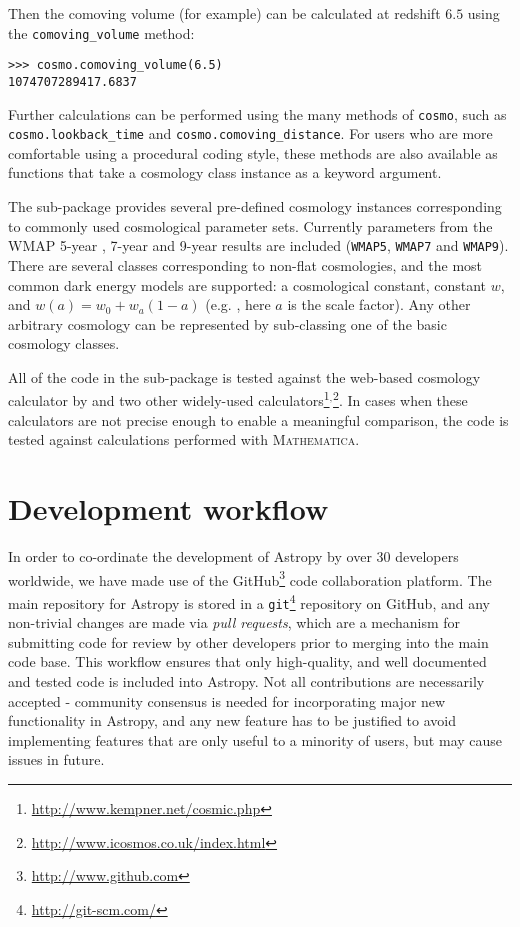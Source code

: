 \documentclass[traditabstract]{aa}
\begin{document}
\noindent Then the comoving volume (for example) can be calculated at
redshift $6.5$ using the \texttt{comoving\_volume} method:

\begin{verbatim}
>>> cosmo.comoving_volume(6.5)
1074707289417.6837
\end{verbatim}

\noindent Further calculations can be performed using the many methods
of \texttt{cosmo}, such as \texttt{cosmo.lookback\_time} and
\texttt{cosmo.comoving\_distance}.  For users who are more comfortable
using a procedural coding style, these methods are also available as
functions that take a cosmology class instance as a keyword argument.

The sub-package provides several pre-defined cosmology instances
corresponding to commonly used cosmological parameter sets. Currently
parameters from the WMAP 5-year \citep{Komatsu09}, 7-year
\citep{Komatsu11} and 9-year results \citep{Hinshaw13} are included
(\texttt{WMAP5}, \texttt{WMAP7} and \texttt{WMAP9}). There are several
classes corresponding to non-flat cosmologies, and the most common
dark energy models are supported: a cosmological constant, constant
$w$, and $w(a) = w_0 + w_a (1-a)$ (e.g. \citealt{Linder03}, here $a$
is the scale factor). Any other arbitrary cosmology can be represented
by sub-classing one of the basic cosmology classes.

All of the code in the sub-package is tested against the web-based
cosmology calculator by \citet{Wright06} and two other widely-used
calculators\footnote{\url{http://www.kempner.net/cosmic.php}}$^,$\footnote{\url{http://www.icosmos.co.uk/index.html}}.
In cases when these calculators are not precise enough to enable a
meaningful comparison, the code is tested against calculations
performed with \textsc{Mathematica}.

\section{Development workflow}

\label{sec:workflow}



In order to co-ordinate the development of Astropy by over 30 developers
worldwide, we have made use of the
GitHub\footnote{\url{http://www.github.com}} code collaboration platform. The
main repository for Astropy is stored in a
\texttt{git}\footnote{\url{http://git-scm.com/}} repository on GitHub, and any
non-trivial changes are made via \textit{pull requests}, which are a mechanism
for submitting code for review by other developers prior to merging into the
main code base. This workflow ensures that only high-quality, and well
documented and tested code is included into Astropy. Not all contributions are
necessarily accepted - community consensus is needed for incorporating major
new functionality in Astropy, and any new feature has to be justified to avoid
implementing features that are only useful to a minority of users, but may
cause issues in future.
\end{document}
